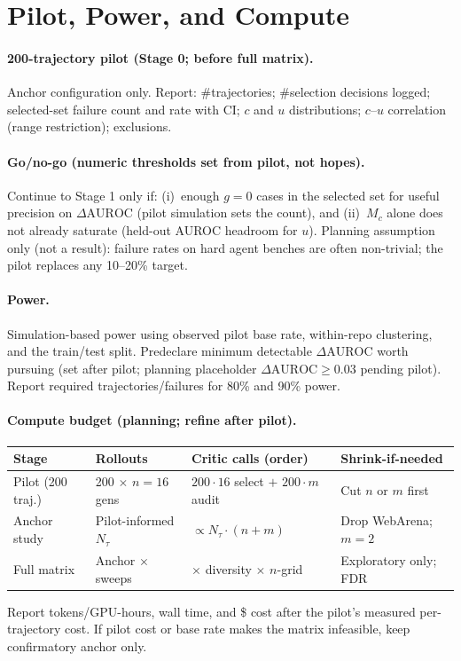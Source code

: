 \documentclass[11pt]{article}
\newcommand{\gzero}{g{=}0}
\newcommand{\DeltaAUROC}{\Delta\mathrm{AUROC}}
\begin{document}
\section{Pilot, Power, and Compute}

\paragraph{200-trajectory pilot (Stage 0; before full matrix).}
Anchor configuration only. Report: \#trajectories; \#selection decisions logged; selected-set failure count and rate with CI; $c$ and $u$ distributions; $c$--$u$ correlation (range restriction); exclusions.

\paragraph{Go/no-go (numeric thresholds set from pilot, not hopes).}
Continue to Stage 1 only if:
(i)~enough $\gzero$ cases in the selected set for useful precision on $\DeltaAUROC$ (pilot simulation sets the count), and
(ii)~$M_{c}$ alone does not already saturate (held-out AUROC headroom for $u$).
Planning assumption only (not a result): failure rates on hard agent benches are often non-trivial; the pilot replaces any 10--20\% target.

\paragraph{Power.}
Simulation-based power using observed pilot base rate, within-repo clustering, and the train/test split.
Predeclare minimum detectable $\DeltaAUROC$ worth pursuing (set after pilot; planning placeholder $\DeltaAUROC\geq 0.03$ pending pilot).
Report required trajectories/failures for 80\% and 90\% power.

\paragraph{Compute budget (planning; refine after pilot).}
\begin{table}[h]
\centering\footnotesize
\begin{tabular}{@{}llll@{}}
\toprule
\textbf{Stage} & \textbf{Rollouts} & \textbf{Critic calls (order)} & \textbf{Shrink-if-needed} \\
\midrule
Pilot (200 traj.)
& 200 $\times$ $n{=}16$ gens
& $200\cdot 16$ select $+$ $200\cdot m$ audit
& Cut $n$ or $m$ first \\
Anchor study
& Pilot-informed $N_\tau$
& $\propto N_\tau\cdot(n+m)$
& Drop WebArena; $m{=}2$ \\
Full matrix
& Anchor $\times$ sweeps
& $\times$ diversity $\times$ $n$-grid
& Exploratory only; FDR \\
\bottomrule
\end{tabular}
\end{table}
\noindent Report tokens/GPU-hours, wall time, and \$ cost after the pilot's measured per-trajectory cost.
If pilot cost or base rate makes the matrix infeasible, keep confirmatory anchor only.
\end{document}

